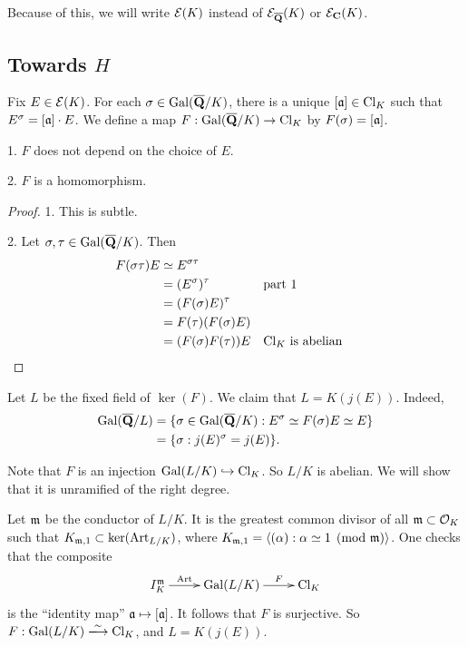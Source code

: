 Because of this, we will write $\mathcal{E}(K)$ instead of $\mathcal{E}_{\overline{\mathbf{Q}}}(K)$ or 
$\mathcal{E}_{\mathbf{C}}(K)$. 





\subsection{Towards \texorpdfstring{$H$}{H}}

Fix $E\in \mathcal{E}(K)$. For each $\sigma\in \operatorname{Gal}(\overline{\mathbf{Q}}/K)$, there is a 
unique $[\mathfrak{a}]\in \operatorname{Cl}_K$ such that $E^\sigma = [\mathfrak{a}]\cdot E$. We define a map 
$F:\operatorname{Gal}(\overline{\mathbf{Q}}/K) \to \operatorname{Cl}_K$ by $F(\sigma) = [\mathfrak{a}]$. 

\begin{prop}
1. $F$ does not depend on the choice of $E$. 

2. $F$ is a homomorphism. 
\end{prop}
\begin{proof}
1. This is subtle. 

2. Let $\sigma,\tau\in \operatorname{Gal}(\overline{\mathbf{Q}}/K)$. Then 
\begin{align*}
  F(\sigma\tau) E 
    &\simeq E^{\sigma\tau} \\
    &= (E^\sigma)^\tau && \text{part 1}\\
    &= (F(\sigma) E)^\tau \\
    &= F(\tau)(F(\sigma) E) \\
    &= (F(\sigma)F(\tau)) E && \text{$\operatorname{Cl}_K$ is abelian}
\end{align*}
\end{proof}

Let $L$ be the fixed field of $\ker(F)$. We claim that 
$L=K(j(E))$. Indeed, 
\begin{align*}
  \operatorname{Gal}(\overline{\mathbf{Q}}/L)
    &=\{\sigma\in \operatorname{Gal}(\overline{\mathbf{Q}}/K):E^\sigma \simeq F(\sigma) E \simeq E\} \\
    &= \{\sigma:j(E)^\sigma = j(E)\} .
\end{align*}

Note that $F$ is an injection $\operatorname{Gal}(L/K)\hookrightarrow \operatorname{Cl}_K$. So 
$L/K$ is abelian. We will show that it is unramified of the right degree. 

Let $\mathfrak{m}$ be the conductor of $L/K$. It is the greatest common divisor of all 
$\mathfrak{m}\subset \mathcal{O}_K$ such that $K_{\mathfrak{m},1}\subset \ker(\operatorname{Art}_{L/K})$, where 
$K_{\mathfrak{m},1} = \langle (\alpha):\alpha\simeq 1\pmod{\mathfrak{m}}\rangle$. One checks that 
the composite 
\[\xymatrix{
  I_K^\fm \ar[r]^-{\artin} 
    & \galois(L/K) \ar[r]^-F 
    & \class_K 
}\]
is the ``identity map'' $\mathfrak{a}\mapsto [\mathfrak{a}]$. It follows that $F$ is surjective. 
So $F:\galois(L/K)\iso \class_K$, and $L=K(j(E))$. 

